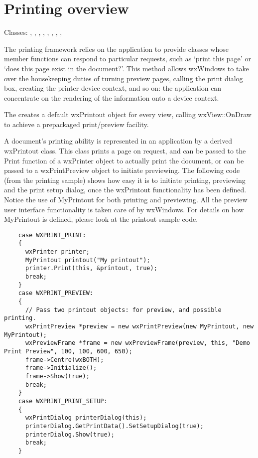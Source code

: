 \section{Printing overview}\label{printingoverview}

Classes: , 
, 
, 
, 
, 
, 
, 
, 

The printing framework relies on the application to provide classes
whose member functions can respond to particular requests, such
as `print this page' or `does this page exist in the document?'.
This method allows wxWindows to take over the housekeeping duties of
turning preview pages, calling the print dialog box, creating
the printer device context, and so on: the application can concentrate
on the rendering of the information onto a device context.

The  creates a default wxPrintout
object for every view, calling wxView::OnDraw to achieve a
prepackaged print/preview facility.

A document's printing ability is represented in an application by a
derived wxPrintout class. This class prints a page on request, and can
be passed to the Print function of a wxPrinter object to actually print
the document, or can be passed to a wxPrintPreview object to initiate
previewing. The following code (from the printing sample) shows how easy
it is to initiate printing, previewing and the print setup dialog, once the wxPrintout
functionality has been defined. Notice the use of MyPrintout for
both printing and previewing. All the preview user interface functionality
is taken care of by wxWindows. For details on how MyPrintout is defined,
please look at the printout sample code.

\begin{verbatim}
    case WXPRINT_PRINT:
    {
      wxPrinter printer;
      MyPrintout printout("My printout");
      printer.Print(this, &printout, true);
      break;
    }
    case WXPRINT_PREVIEW:
    {
      // Pass two printout objects: for preview, and possible printing.
      wxPrintPreview *preview = new wxPrintPreview(new MyPrintout, new MyPrintout);
      wxPreviewFrame *frame = new wxPreviewFrame(preview, this, "Demo Print Preview", 100, 100, 600, 650);
      frame->Centre(wxBOTH);
      frame->Initialize();
      frame->Show(true);
      break;
    }
    case WXPRINT_PRINT_SETUP:
    {
      wxPrintDialog printerDialog(this);
      printerDialog.GetPrintData().SetSetupDialog(true);
      printerDialog.Show(true);
      break;
    }
\end{verbatim}

